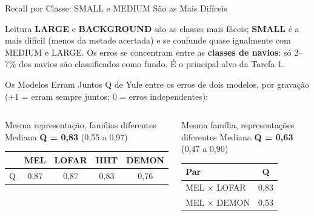 \documentclass[aspectratio=169]{beamer}
\begin{document}
\begin{frame}{Recall por Classe: SMALL e MEDIUM São as Mais Difíceis}
    \vspace{0.1cm}
    \begin{alertblock}{Leitura}
        \scriptsize
        \textbf{LARGE} e \textbf{BACKGROUND} são as classes mais fáceis; \textbf{SMALL} é a mais difícil (menos da metade acertada) e se confunde quase igualmente com MEDIUM e LARGE. Os erros se concentram entre as \textbf{classes de navios}: só 2--7\% dos navios são classificados como fundo. É o principal alvo da Tarefa 1.
    \end{alertblock}
\end{frame}

\begin{frame}{Os Modelos Erram Juntos}
    \footnotesize
    Q de Yule entre os erros de dois modelos, por gravação ($+1$ = erram sempre juntos; $0$ = erros independentes):

    \vspace{0.1cm}
    \begin{columns}[t]
        \begin{block}{\small Mesma representação, famílias diferentes}
            \scriptsize
            \centering
            Mediana \textbf{Q = 0,83} (0,55 a 0,97)

            \vspace{0.1cm}
            \begin{tabular}{lcccc}
            \toprule
             & MEL & LOFAR & HHT & DEMON \\
            \midrule
            Q & 0,87 & 0,87 & 0,83 & 0,76 \\
            \bottomrule
            \end{tabular}
        \end{block}

        \begin{block}{\small Mesma família, representações diferentes}
            \scriptsize
            \centering
            Mediana \textbf{Q = 0,63} (0,47 a 0,90)

            \vspace{0.1cm}
            \begin{tabular}{lc}
            \toprule
            Par & Q \\
            \midrule
            MEL $\times$ LOFAR & 0,83 \\
            MEL $\times$ DEMON & 0,53 \\
            \bottomrule
            \end{tabular}
        \end{block}
    \end{columns}


\end{frame}
\end{document}
